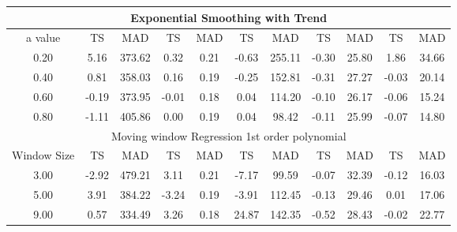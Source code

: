 \documentclass[conference,onecolumn]{IEEEtran}
\begin{document}
\begin{table}[ht]
\begin{tabular}{|c|c|c|c|c|c|c|c|c|c|c|}
\multicolumn{11}{|c|}{Exponential Smoothing with Trend}                                                                                                                                                \\ \hline
a value     & TS               & MAD              & TS                 & MAD             & TS              & MAD            & TS               & MAD             & TS               & MAD              \\ \hline
0.20        & 5.16             & 373.62           & 0.32               & 0.21            & -0.63           & 255.11         & -0.30            & 25.80           & 1.86             & 34.66            \\ \hline
0.40        & 0.81             & 358.03           & 0.16               & 0.19            & -0.25           & 152.81         & -0.31            & 27.27           & -0.03            & 20.14            \\ \hline
0.60        & -0.19            & 373.95           & -0.01              & 0.18            & 0.04            & 114.20         & -0.10            & 26.17           & -0.06            & 15.24            \\ \hline
0.80        & -1.11            & 405.86           & 0.00               & 0.19            & 0.04            & 98.42          & -0.11            & 25.99           & -0.07            & 14.80            \\ \hline
\multicolumn{11}{|c|}{Moving window Regression 1st order polynomial}                                                                                                                                   \\ \hline
Window Size & TS               & MAD              & TS                 & MAD             & TS              & MAD            & TS               & MAD             & TS               & MAD              \\ \hline
3.00        & -2.92            & 479.21           & 3.11               & 0.21            & -7.17           & 99.59          & -0.07            & 32.39           & -0.12            & 16.03            \\ \hline
5.00        & 3.91             & 384.22           & -3.24              & 0.19            & -3.91           & 112.45         & -0.13            & 29.46           & 0.01             & 17.06            \\ \hline
9.00        & 0.57             & 334.49           & 3.26               & 0.18            & 24.87           & 142.35         & -0.52            & 28.43           & -0.02            & 22.77            \\ \hline

\end{tabular}
\end{table}
\end{document}
